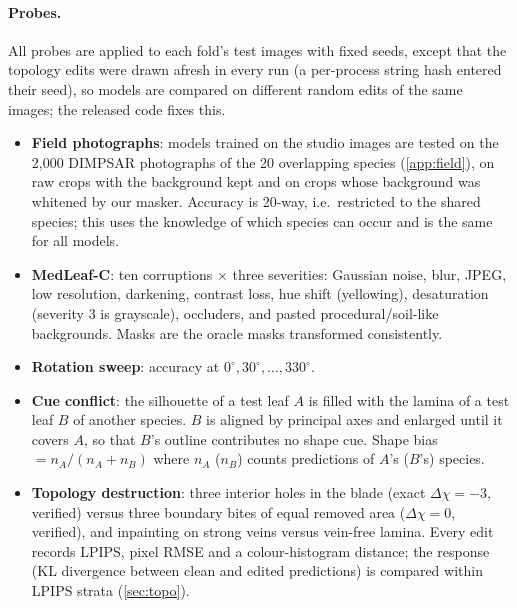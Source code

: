 \paragraph{Probes.} All probes are applied to each fold's test images with fixed seeds, except that the
topology edits were drawn afresh in every run (a per-process string hash entered their seed), so models
are compared on different random edits of the same images; the released code fixes this.
\begin{itemize}
\item \textbf{Field photographs}: models trained on the studio images are tested on the 2{,}000 DIMPSAR
photographs of the 20 overlapping species (\cref{app:field}), on raw crops with the background kept
and on crops whose background was whitened by our masker. Accuracy is 20-way, i.e.\ restricted to the
shared species; this uses the knowledge of which species can occur and is the same for all models.
\item \textbf{MedLeaf-C}: ten corruptions $\times$ three severities: Gaussian noise, blur, JPEG,
low resolution, darkening, contrast loss, hue shift (yellowing), desaturation (severity 3 is
grayscale), occluders, and pasted procedural/soil-like backgrounds. Masks are the oracle masks
transformed consistently.
\item \textbf{Rotation sweep}: accuracy at $0^\circ,30^\circ,\dots,330^\circ$.
\item \textbf{Cue conflict}: the silhouette of a test leaf $A$ is filled with the lamina of a test
leaf $B$ of another species. $B$ is aligned by principal axes and enlarged until it covers $A$, so
that $B$'s outline contributes no shape cue. Shape bias $=n_A/(n_A+n_B)$ where $n_A$ ($n_B$) counts
predictions of $A$'s ($B$'s) species.
\item \textbf{Topology destruction}: three interior holes in the blade (exact $\Delta\chi=-3$,
verified) versus three boundary bites of equal removed area ($\Delta\chi=0$, verified), and inpainting
on strong veins versus vein-free lamina. Every edit records LPIPS, pixel RMSE and a colour-histogram
distance; the response (KL divergence between clean and edited predictions) is compared within LPIPS
strata (\cref{sec:topo}).
\end{itemize}
